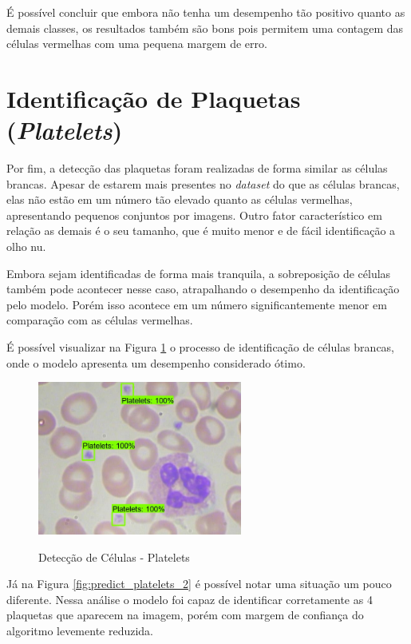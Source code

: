 É possível concluir que embora não tenha um desempenho tão positivo quanto as demais classes, os resultados também são bons pois permitem uma contagem das células vermelhas com uma pequena margem de erro.

\section{Identificação de Plaquetas (\emph{Platelets})}

Por fim, a detecção das plaquetas foram realizadas de forma similar as células brancas. Apesar de estarem mais presentes no \emph{dataset} do que as células brancas, elas não estão em um número tão elevado quanto as células vermelhas, apresentando pequenos conjuntos por imagens. Outro fator característico em relação as demais é o seu tamanho, que é muito menor e de fácil identificação a olho nu.

Embora sejam identificadas de forma mais tranquila, a sobreposição de células também pode acontecer nesse caso, atrapalhando o desempenho da identificação pelo modelo. Porém isso acontece em um número significantemente menor em comparação com as células vermelhas.

É possível visualizar na Figura \ref{fig:predict_platelets} o processo de identificação de células brancas, onde o modelo apresenta um desempenho considerado ótimo.

\begin{figure}[!htb]
	\centering
	\caption{Detecção de Células - Platelets}
	\includegraphics[width=0.60\textwidth]{img/predict_platelets.jpeg}
	\label{fig:predict_platelets}
\end{figure}

Já na Figura \ref{fig:predict_platelets_2} é possível notar uma situação um pouco diferente. Nessa análise o modelo foi capaz de identificar corretamente as 4 plaquetas que aparecem na imagem, porém com margem de confiança do algoritmo levemente reduzida. 

